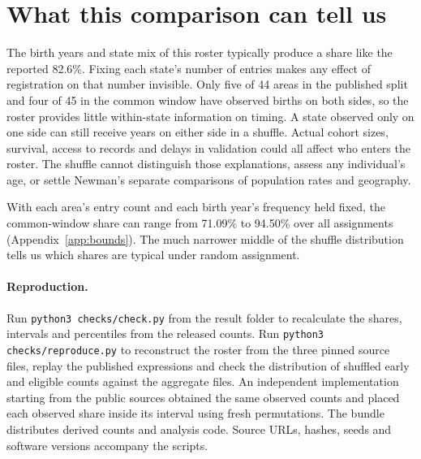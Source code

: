 \documentclass[11pt]{article}
\begin{document}
\section{What this comparison can tell us}
The birth years and state mix of this roster typically produce a share like the reported 82.6\%. Fixing each state's number of entries makes any effect of registration on that number invisible. Only five of 44 areas in the published split and four of 45 in the common window have observed births on both sides, so the roster provides little within-state information on timing. A state observed only on one side can still receive years on either side in a shuffle. Actual cohort sizes, survival, access to records and delays in validation could all affect who enters the roster. The shuffle cannot distinguish those explanations, assess any individual's age, or settle Newman's separate comparisons of population rates and geography.

With each area's entry count and each birth year's frequency held fixed, the common-window share can range from 71.09\% to 94.50\% over all assignments (Appendix~\ref{app:bounds}). The much narrower middle of the shuffle distribution tells us which shares are typical under random assignment.

\paragraph{Reproduction.}
Run \texttt{python3 checks/check.py} from the result folder to recalculate the shares, intervals and percentiles from the released counts. Run \texttt{python3 checks/reproduce.py} to reconstruct the roster from the three pinned source files, replay the published expressions and check the distribution of shuffled early and eligible counts against the aggregate files. An independent implementation starting from the public sources obtained the same observed counts and placed each observed share inside its interval using fresh permutations. The bundle distributes derived counts and analysis code. Source URLs, hashes, seeds and software versions accompany the scripts.
\end{document}
